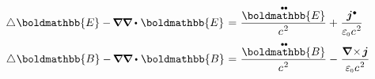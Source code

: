 \begin{align*}
\Laplacian \hspace{.05ex} \boldmathbb{E} - \hspace{-0.15ex} \boldnabla \tikzmark{beginElectricGaussInWaves} \boldnabla \dotp \hspace{.12ex} \boldmathbb{E} \tikzmark{endElectricGaussInWaves} \hspace{.2ex}
&= %
\hspace{.1ex} \displaystyle\frac{\raisemath{-0.12em}{ \mathdotdotabove{\boldmathbb{E}} }}{\raisemath{-0.1em}{ c^{\hspace{.16ex}2} }}
+ \hspace{.1ex} \displaystyle\frac{\currentdensity^{\hspace{.1ex}\tikz[baseline=-0.36ex]\draw[black, fill=black] (0,0) circle (.28ex);}}{\raisemath{-0.1em}{ \vacuumpermittivity \hspace{.1ex} c^{\hspace{.16ex}2} }}
\\[.2em]
%
\Laplacian \hspace{.05ex} \boldmathbb{B} - \hspace{-0.15ex} \boldnabla \tikzmark{beginMagneticGaussInWaves} \boldnabla \dotp \hspace{.12ex} \boldmathbb{B} \tikzmark{endMagneticGaussInWaves} \hspace{.1ex}
&=
\hspace{.1ex} \displaystyle\frac{\raisemath{-0.12em}{ \mathdotdotabove{\boldmathbb{B}} }}{\raisemath{-0.1em}{ c^{\hspace{.16ex}2} }}
- \hspace{.1ex} \displaystyle\frac{ \boldnabla \hspace{-0.33ex} \times \hspace{-0.25ex} \currentdensity }{\raisemath{-0.1em}{ \vacuumpermittivity \hspace{.1ex} c^{\hspace{.16ex}2} }}
\end{align*}%
%

